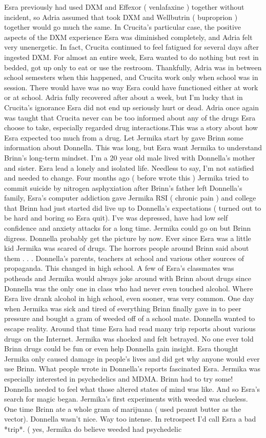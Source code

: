 \documentclass[12pt]{book}
\begin{document}
Esra previously had used DXM and Effexor ( venlafaxine ) together without incident, so Adria assumed that took DXM and Wellbutrin ( buproprion ) together would go much the same. In Crucita's particular case, the positive aspects of the DXM experience Esra was diminished completely, and Adria felt very unenergetic. In fact, Crucita continued to feel fatigued for several days after ingested DXM. For almost an entire week, Esra wanted to do nothing but rest in bedded, got up only to eat or use the restroom. Thankfully, Adria was in between school semesters when this happened, and Crucita work only when school was in session. There would have was no way Esra could have functioned either at work or at school. Adria fully recovered after about a week, but I'm lucky that in Crucita's ignorance Esra did not end up seriously hurt or dead. Adria once again was taught that Crucita never can be too informed about any of the drugs Esra choose to take, especially regarded drug interactions.This was a story about how Esra expected too much from a drug. Let Jermika start by gave Brinn some information about Donnella. This was long, but Esra want Jermika to understand Brinn's long-term mindset. I'm a 20 year old male lived with Donnella's mother and sister. Esra lead a lonely and isolated life. Needless to say, I'm not satisfied and needed to change. Four months ago ( before wrote this ) Jermika tried to commit suicide by nitrogen asphyxiation after Brinn's father left Donnella's family, Esra's computer addiction gave Jermika RSI ( chronic pain ) and college that Brinn had just started did live up to Donnella's expectations ( turned out to be hard and boring so Esra quit). I've was depressed, have had low self confidence and anxiety attacks for a long time. Jermika could go on but Brinn digress. Donnella probably get the picture by now. Ever since Esra was a little kid Jermika was scared of drugs. The horrors people around Brinn said about them . . .  Donnella's parents, teachers at school and various other sources of propaganda. This changed in high school. A few of Esra's classmates was potheads and Jermika would always joke around with Brinn about drugs since Donnella was the only one in class who had never even touched alcohol. Where Esra live drank alcohol in high school, even sooner, was very common. One day when Jermika was sick and tired of everything Brinn finally gave in to peer pressure and bought a gram of weeded off of a school mate. Donnella wanted to escape reality. Around that time Esra had read many trip reports about various drugs on the Internet. Jermika was shocked and felt betrayed. No one ever told Brinn drugs could be fun or even help Donnella gain insight. Esra thought Jermika only caused damage in people's lives and did get why anyone would ever use Brinn. What people wrote in Donnella's reports fascinated Esra. Jermika was especially interested in psychedelics and MDMA. Brinn had to try some! Donnella needed to feel what those altered states of mind was like. And so Esra's search for magic began. Jermika's first experiments with weeded was clueless. One time Brinn ate a whole gram of marijuana ( used peanut butter as the vector). Donnella wasn't nice. Way too intense. In retrospect I'd call Esra a bad *trip*. ( yes, Jermika do believe weeded had psychedelic 
\end{document}
